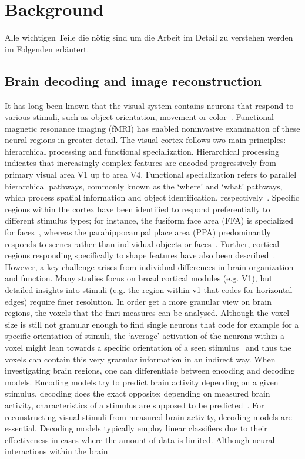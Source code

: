 \chapter{Background}

Alle wichtigen Teile die nötig sind um die Arbeit im Detail zu verstehen werden im Folgenden erläutert. 

\section{Brain decoding and image reconstruction}

It has long been known that the visual system contains neurons that respond to various stimuli, such as object orientation, movement or color~\cite{grill-spectorHUMANVISUALCORTEX2004}. Functional magnetic resonance imaging (fMRI) has enabled noninvasive examination of these neural regions in greater detail. The visual cortex follows two main principles: hierarchical processing and functional specialization. Hierarchical processing indicates that increasingly complex features are encoded progressively from primary visual area V1 up to area V4. Functional specialization refers to parallel hierarchical pathways, commonly known as the `where' and `what' pathways, which process spatial information and object identification, respectively~\cite{grill-spectorHUMANVISUALCORTEX2004,ungerleiderWhatWhereHuman1994}. Specific regions within the cortex have been identified to respond preferentially to different stimulus types; for instance, the fusiform face area (FFA) is specialized for faces~\cite{kanwisherFusiformFaceArea1997}, whereas the parahippocampal place area (PPA) predominantly responds to scenes rather than individual objects or faces~\cite{epsteinCorticalRepresentationLocal1998}. Further, cortical regions responding specifically to shape features have also been described~\cite{kourtziCorticalRegionsInvolved2000}. However, a key challenge arises from individual differences in brain organization and function. Many studies focus on broad cortical modules (e.g. V1), but detailed insights into stimuli (e.g. the region within v1 that codes for horizontal edges) require finer resolution. In order get a more granular view on brain regions, the voxels that the fmri measures can be analysed. Although the voxel size is still not granular enough to find single neurons that code for example for a specific orientation of stimuli, the `average' activation of the neurons within a voxel might lean towards a specific orientation of a seen stimulus~\cite{kamitaniDecodingVisualSubjective2005} and thus the voxels can contain this very granular information in an indirect way. When investigating brain regions, one can differentiate between encoding and decoding models. Encoding models try to predict brain activity depending on a given stimulus, decoding does the exact opposite: depending on measured brain activity, characteristics of a stimulus are supposed to be predicted~\cite{naselarisEncodingDecodingFMRI2011}. For reconstructing visual stimuli from measured brain activity, decoding models are essential. Decoding models typically employ linear classifiers due to their effectiveness in cases where the amount of data is limited. Although neural interactions within the brain 